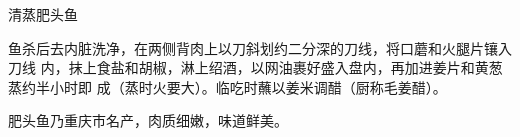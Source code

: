 %
%
%
%
%
%
%
\begin{recipe}{清蒸肥头鱼}

\ingredients


\preparation

鱼杀后去内脏洗净，在两侧背肉上以刀斜划约二分深的刀线，将口蘑和火腿片镶入刀线
内，抹上食盐和胡椒，淋上绍酒，以网油裹好盛入盘内，再加进姜片和黄葱蒸约半小时即
成（蒸时火要大）。临吃时蘸以姜米调醋（厨称毛姜醋）。

\features

肥头鱼乃重庆市名产，肉质细嫩，味道鲜美。

\end{recipe}

